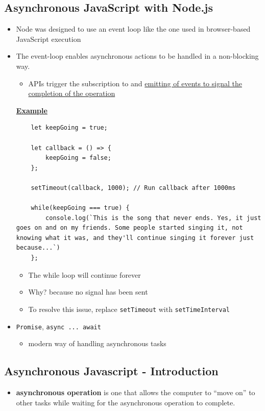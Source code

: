 \documentclass[12pt]{article}
\begin{document}
\subsection{Asynchronous JavaScript with Node.js}
\begin{itemize}
    \item Node was designed to use an event loop like the one used in browser-based JavaScript execution
    \item The event-loop enables asynchronous actions to be handled in a non-blocking way.
    \begin{itemize}
        \item APIs trigger the subscription to and \ul{emitting of events to signal the completion of the operation}
    \end{itemize}

    \underline{\textbf{Example}}

    \bigskip

    \begin{lstlisting}
    let keepGoing = true;

    let callback = () => {
        keepGoing = false;
    };

    setTimeout(callback, 1000); // Run callback after 1000ms

    while(keepGoing === true) {
        console.log(`This is the song that never ends. Yes, it just goes on and on my friends. Some people started singing it, not knowing what it was, and they'll continue singing it forever just because...`)
    };
    \end{lstlisting}

    \begin{itemize}
        \item The while loop will continue forever
        \item Why? because no signal has been sent
        \item To resolve this issue, replace \texttt{setTimeout} with \texttt{setTimeInterval}
    \end{itemize}
    \item \texttt{Promise}, \texttt{async ... await}
    \begin{itemize}
        \item modern way of handling asynchronous tasks
    \end{itemize}
\end{itemize}

\subsection{Asynchronous Javascript - Introduction}
\begin{itemize}
    \item \textbf{asynchronous operation} is one that allows the computer to “move on” to other tasks while waiting for the asynchronous operation to complete.
\end{itemize}
\end{document}
